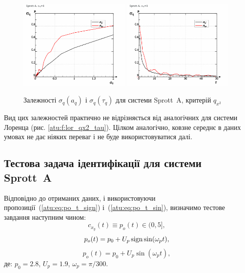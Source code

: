 \begin{figure}[htb!]
\begin{center}
  \includegraphics[width=0.49\textwidth]{p/cha/spr_a/sprott_a_qx2_tau-p_aq_sd.png}
  \hfill
  \includegraphics[width=0.49\textwidth]{p/cha/spr_a/sprott_a_qx2_tau-p_tau_sd.png}
\end{center}
\caption{Залежності $\sigma_{q} (a_q)$ і $\sigma_{q} (\tau_q)$ для системи Sprott~A, критерій $q_{x^2}$}
\label{atu:f:spr_a_qx2_tau}
\end{figure}

Вид цих залежностей практично не відрізняється від аналогічних
для системи Лоренца (рис. \ref{atu:f:lor_qx2_tau}). Цілком аналогічно,
ковзне середнє в даних умовах не дає ніяких переваг і не буде
використовуватися далі.



\subsection{Тестова задача ідентифікації для системи Sprott~A} %

Відповідно до отриманих даних, і використовуючи
пропозиції~(\ref{atu:eq:po_t_sign}) і~(\ref{atu:eq:po_t_sin}),
%
визначимо тестове завдання наступним чином:
\[
  c_{x_y}(t) \equiv p_o(t) \in (0, 5],
\]
%
\begin{equation}
  p_o(t) = p_0 +  U_{p} \operatorname*{sign} \sin( \omega_{p} t ),
  \label{atu:eq:spr_a_po_t_sign}
\end{equation}
%
%
\begin{equation}
  p_o(t) = p_0 +  U_{p} \sin( \omega_{p} t ),
  \label{atu:eq:spr_a_po_t_sin}
\end{equation}
%
де:
$p_0 = 2.8$, $U_p=1.9$, $\omega_p=\pi/300$.


